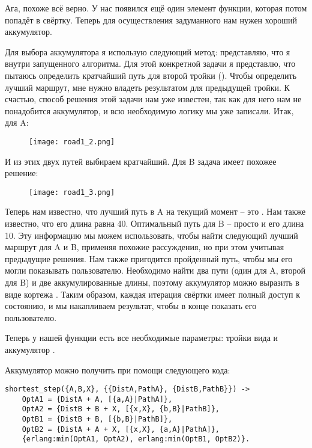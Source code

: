 Ага, похоже всё верно.
У нас появился ещё один элемент функции, которая потом попадёт в свёртку.
Теперь для осуществления задуманного нам нужен хороший аккумулятор.

Для выбора аккумулятора я использую следующий метод: представляю, что я внутри запущенного алгоритма.
Для этой конкретной задачи я представлю, что пытаюсь определить кратчайший путь для второй тройки ().
Чтобы определить лучший маршрут, мне нужно владеть результатом для предыдущей тройки.
К счастью, способ решения этой задачи нам уже известен, так как для него нам не понадобится аккумулятор, и всю необходимую логику мы уже записали.
Итак, для A:
\begin{figure}[h!]
    \centering
    \texttt{[image: road1\_2.png]}
\end{figure}

И из этих двух путей выбираем кратчайший.
\clearpage
Для B задача имеет похожее решение:
\begin{figure}[!htbp]
    \centering
    \texttt{[image: road1\_3.png]}
\end{figure}

Теперь нам известно, что лучший путь в A на текущий момент \--- это \ops{[B,X]}.
Нам также известно, что его длина равна 40.
Оптимальный путь для B \--- просто \ops{[B]} и его длина 10.
Эту информацию мы можем использовать, чтобы найти следующий лучший маршрут для A и B, применяя похожие рассуждения, но при этом учитывая предыдущие решения.
Нам также пригодится пройденный путь, чтобы мы его могли показывать пользователю.
Необходимо найти два пути (один для A, второй для B) и две аккумулированные длины, поэтому аккумулятор можно выразить в виде кортежа .
Таким образом, каждая итерация свёртки имеет полный доступ к состоянию, и мы накапливаем результат, чтобы в конце показать его пользователю.

Теперь у нашей функции есть все необходимые параметры: тройки вида  и аккумулятор .

Аккумулятор можно получить при помощи следующего кода:
\begin{lstlisting}[style=erlang]
shortest_step({A,B,X}, {{DistA,PathA}, {DistB,PathB}}) ->
    OptA1 = {DistA + A, [{a,A}|PathA]},
    OptA2 = {DistB + B + X, [{x,X}, {b,B}|PathB]},
    OptB1 = {DistB + B, [{b,B}|PathB]},
    OptB2 = {DistA + A + X, [{x,X}, {a,A}|PathA]},
    {erlang:min(OptA1, OptA2), erlang:min(OptB1, OptB2)}.
\end{lstlisting}


